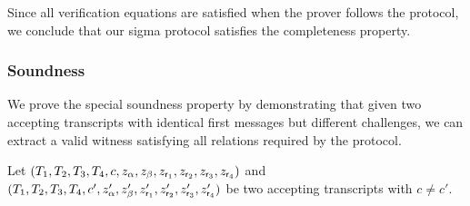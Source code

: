 Since all verification equations are satisfied when the prover follows the protocol, we conclude that our sigma protocol satisfies the completeness property.


\subsubsection*{Soundness}
We prove the special soundness property by demonstrating that given two accepting transcripts with identical first messages but different challenges, we can extract a valid witness satisfying all relations required by the protocol.

Let $(T_1, T_2, T_3, T_4, c, z_\alpha, z_\beta, z_{\mathsf{r}_1}, z_{\mathsf{r}_2}, z_{\mathsf{r}_3}, z_{\mathsf{r}_4})$ and $(T_1, T_2, T_3, T_4, c', z'_\alpha, z'_\beta, z'_{\mathsf{r}_1}, z'_{\mathsf{r}_2}, z'_{\mathsf{r}_3}, z'_{\mathsf{r}_4})$ be two accepting transcripts with $c \neq c'$.

